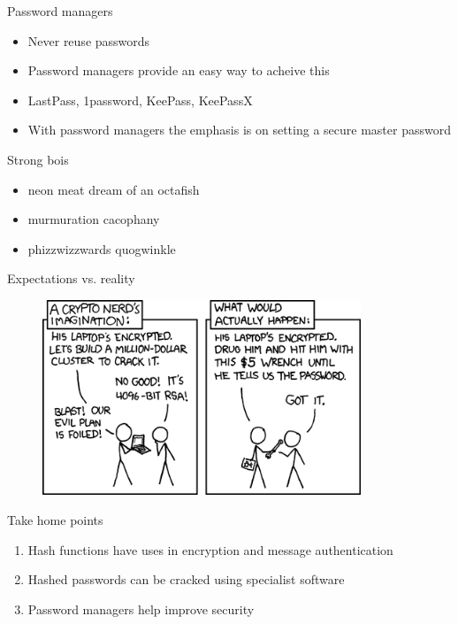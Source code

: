 \documentclass[12pt,aspectratio=169]{beamer}
\begin{document}
\begin{frame}{Password managers}
  \begin{itemize}
    \item Never reuse passwords
    \item Password managers provide an easy way to acheive this
    \item LastPass, 1password, KeePass, KeePassX
    \item With password managers the emphasis is on setting a secure master password
  \end{itemize}
\end{frame}

\begin{frame}{Strong bois}
  \begin{itemize}
    \item neon meat dream of an octafish
    \item murmuration cacophany
    \item phizzwizzwards quogwinkle
  \end{itemize}
\end{frame}

\begin{frame}{Expectations vs. reality}
  \begin{figure}
    \includegraphics[width=0.85\textwidth]{security.png}
  \end{figure}
\end{frame}

\begin{frame}{Take home points}
  \begin{enumerate}
    \item Hash functions have uses in encryption and message authentication
    \item Hashed passwords can be cracked using specialist software
    \item Password managers help improve security
  \end{enumerate}
\end{frame}
\end{document}
